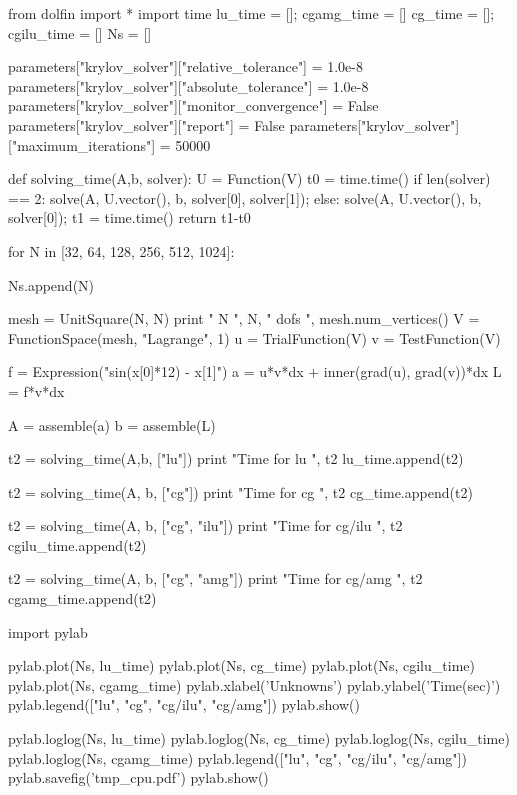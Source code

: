 \begin{example}
\begin{python}
from dolfin import *
import time
lu_time = []; cgamg_time = []
cg_time = []; cgilu_time = []
Ns = []

parameters["krylov_solver"]["relative_tolerance"] = 1.0e-8
parameters["krylov_solver"]["absolute_tolerance"] = 1.0e-8
parameters["krylov_solver"]["monitor_convergence"] = False
parameters["krylov_solver"]["report"] = False
parameters["krylov_solver"]["maximum_iterations"] = 50000

def solving_time(A,b, solver):
  U = Function(V)
  t0 = time.time()
  if len(solver) == 2: 
    solve(A, U.vector(), b, solver[0], solver[1]);
  else: 
    solve(A, U.vector(), b, solver[0]);
  t1 = time.time()
  return t1-t0

for N in [32, 64, 128, 256, 512, 1024]:

  Ns.append(N)

  mesh = UnitSquare(N, N)
  print " N ", N, " dofs ", mesh.num_vertices()
  V = FunctionSpace(mesh, "Lagrange", 1)
  u = TrialFunction(V)
  v = TestFunction(V)

  f = Expression("sin(x[0]*12) - x[1]")
  a = u*v*dx  + inner(grad(u), grad(v))*dx
  L = f*v*dx

  A = assemble(a)
  b = assemble(L)
  
  t2 = solving_time(A,b, ["lu"])
  print "Time for lu ", t2
  lu_time.append(t2)
  
  t2 = solving_time(A, b, ["cg"])
  print "Time for cg ", t2
  cg_time.append(t2)

  t2 = solving_time(A, b, ["cg", "ilu"])
  print "Time for cg/ilu ", t2
  cgilu_time.append(t2)

  t2 = solving_time(A, b, ["cg", "amg"])
  print "Time for cg/amg ", t2
  cgamg_time.append(t2)


import pylab

pylab.plot(Ns, lu_time)
pylab.plot(Ns, cg_time)
pylab.plot(Ns, cgilu_time)
pylab.plot(Ns, cgamg_time)  
pylab.xlabel('Unknowns')
pylab.ylabel('Time(sec)')
pylab.legend(["lu", "cg", "cg/ilu", "cg/amg"])
pylab.show()

pylab.loglog(Ns, lu_time)
pylab.loglog(Ns, cg_time)
pylab.loglog(Ns, cgilu_time)
pylab.loglog(Ns, cgamg_time)
pylab.legend(["lu", "cg", "cg/ilu", "cg/amg"])
pylab.savefig('tmp_cpu.pdf')
pylab.show()
\end{python}
\end{example}

